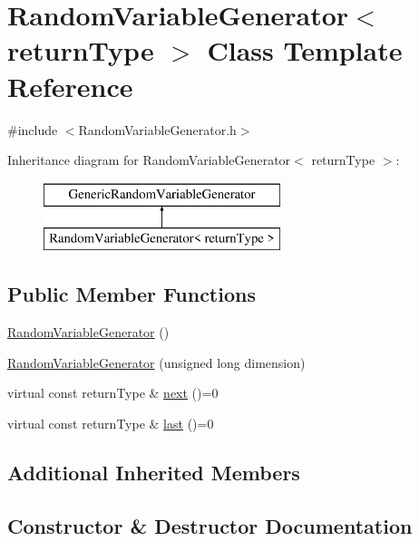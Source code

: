 \hypertarget{class_random_variable_generator}{}\section{Random\+Variable\+Generator$<$ return\+Type $>$ Class Template Reference}
\label{class_random_variable_generator}


{\ttfamily \#include $<$Random\+Variable\+Generator.\+h$>$}

Inheritance diagram for Random\+Variable\+Generator$<$ return\+Type $>$\+:\begin{figure}[H]
\begin{center}
\leavevmode
\includegraphics[height=2.000000cm]{class_random_variable_generator}
\end{center}
\end{figure}
\subsection*{Public Member Functions}
\begin{DoxyCompactItemize}
\item 
\hyperlink{class_random_variable_generator_a5404af4975ab4f9452e5d99b0479fa23}{Random\+Variable\+Generator} ()
\item 
\hyperlink{class_random_variable_generator_a4bb14a0ef48a87cea066c69ea74175af}{Random\+Variable\+Generator} (unsigned long dimension)
\item 
virtual const return\+Type \& \hyperlink{class_random_variable_generator_a5178e1f85eff432dffd6320767136836}{next} ()=0
\item 
virtual const return\+Type \& \hyperlink{class_random_variable_generator_aa84922aa58871845bc12116e05e6b5d4}{last} ()=0
\end{DoxyCompactItemize}
\subsection*{Additional Inherited Members}


\subsection{Constructor \& Destructor Documentation}
\hypertarget{class_random_variable_generator_a5404af4975ab4f9452e5d99b0479fa23}{}\label{class_random_variable_generator_a5404af4975ab4f9452e5d99b0479fa23} 
